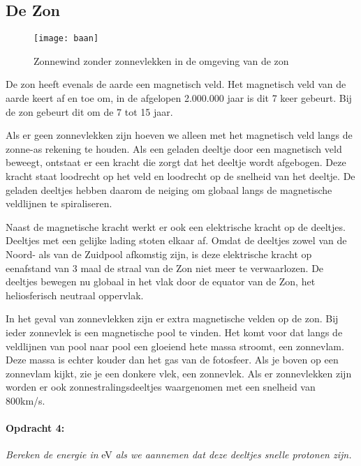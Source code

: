 \subsection{De Zon}

\begin{figure}[h]
\noindent \begin{centering}
\texttt{[image: baan]}
\par\end{centering}

\caption{Zonnewind zonder zonnevlekken in de omgeving van de zon}
\end{figure}


De zon heeft evenals de aarde een magnetisch veld. Het magnetisch
veld van de aarde keert af en toe om, in de afgelopen 2.000.000 jaar
is dit 7 keer gebeurt. Bij de zon gebeurt dit om de 7 tot 15 jaar. 

Als er geen zonnevlekken zijn hoeven we alleen met het magnetisch
veld langs de zonne-as rekening te houden. Als een geladen deeltje
door een magnetisch veld beweegt, ontstaat er een kracht die zorgt
dat het deeltje wordt afgebogen. Deze kracht staat loodrecht op het
veld en loodrecht op de snelheid van het deeltje. De geladen deeltjes
hebben daarom de neiging om globaal langs de magnetische veldlijnen
te spiraliseren.

Naast de magnetische kracht werkt er ook een elektrische kracht op
de deeltjes. Deeltjes met een gelijke lading stoten elkaar af. Omdat
de deeltjes zowel van de Noord- als van de Zuidpool afkomstig zijn,
is deze elektrische kracht op eenafstand van 3 maal de straal van
de Zon niet meer te verwaarlozen. De deeltjes bewegen nu globaal in
het vlak door de equator van de Zon, het heliosferisch neutraal oppervlak.

In het geval van zonnevlekken zijn er extra magnetische velden op
de zon. Bij ieder zonnevlek is een magnetische pool te vinden. Het
komt voor dat langs de veldlijnen van pool naar pool een gloeiend
hete massa stroomt, een zonnevlam. Deze massa is echter kouder dan
het gas van de fotosfeer. Als je boven op een zonnevlam kijkt, zie
je een donkere vlek, een zonnevlek. Als er zonnevlekken zijn worden
er ook zonnestralingsdeeltjes waargenomen met een snelheid van 800km/s.


\paragraph*{Opdracht 4:}

\emph{Bereken de energie in }eV\emph{ als we aannemen dat deze deeltjes
snelle protonen zijn. }


